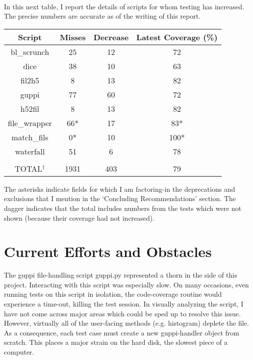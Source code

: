 \documentclass[12pt]{article}
\begin{document}
\begin{center}
\

In this next table, I report the details of scripts for whom testing has increased. The precise numbers are accurate as of the writing of this report.

 \begin{tabular}{||c c c c||} 
 \hline
 Script & Misses & Decrease & Latest Coverage (\%)\\ [0.5ex] 
\hline
bl\_scrunch & 25 & 12 & 72 \\
\hline
dice & 38 & 10 & 63 \\
\hline
fil2h5 & 8 & 13 & 82 \\
\hline
guppi & 77 & 60 & 72 \\
\hline
h52fil & 8 & 13 & 82 \\
\hline
file\_wrapper & 66* & 17 & 83* \\
\hline
match\_fils & 0* & 10 & 100* \\
\hline
waterfall & 51 & 6 & 78 \\
\hline
&&&
\\
\hline
TOTAL$^\dagger$ & 1931 & 403 & 79 \\ [1ex] 
\hline
\end{tabular}
\end{center}

The asterisks indicate fields for which I am factoring-in the deprecations and exclusions that I mention in the `Concluding Recommendations' section. The dagger indicates that the total includes numbers from the tests which were not shown (because their coverage had not increased).


\section{Current Efforts and Obstacles}

\quad \quad The guppi file-handling script guppi.py represented a thorn in the side of this project. Interacting with this script was especially slow. On many occasions, even running tests on this script in isolation, the code-coverage routine would experience a time-out, killing the test session. In visually analyzing the script, I have not come across major areas which could be sped up to resolve this issue. However, virtually all of the user-facing methods (e.g. histogram) deplete the file. As a consequence, each test case must create a new guppi-handler object from scratch. This places a major strain on the hard disk, the slowest piece of a computer.
\end{document}
